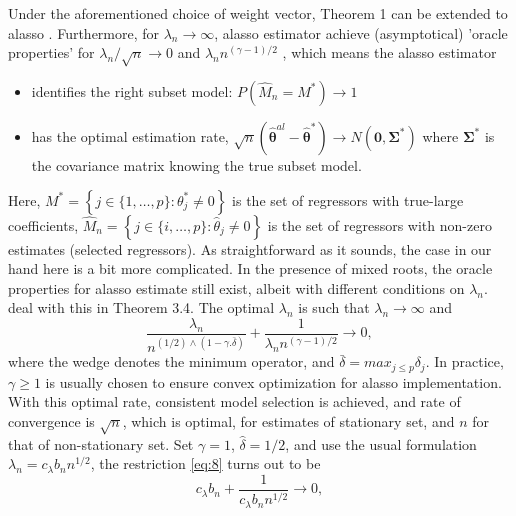 \documentclass[12pt,a4paper]{article}
\begin{document}
Under the aforementioned choice of weight vector, Theorem 1 can be extended to alasso \citep{knight2000asymptotics}. Furthermore, for $\lambda_n \rightarrow \infty $, alasso estimator achieve (asymptotical) 'oracle properties' for $ \lambda_n/\sqrt{n} \rightarrow 0 $ and $ \lambda_nn^{(\gamma - 1)/2} $ \citep{zou2006adaptive}, which means the alasso estimator
\begin{itemize}
	\item identifies the right subset model: $ P(\hat{M}_n = M^*) \rightarrow 1 $
	\item has the optimal estimation rate, $\sqrt{n}(\hat{\bm{\theta}}^{al} - \hat{\bm{\theta}}^*) \rightarrow N(\bm{0}, \bm{\Sigma}^*) $  where $ \bm{\Sigma}^* $ is the covariance matrix knowing the true subset model.
\end{itemize}
Here, $ M^* = \left\lbrace j \in \{1, \ldots, p\}: \theta^*_j \neq 0 \right\rbrace $ is the set of regressors with true-large coefficients, $ \hat{M}_n = \left\lbrace j \in \{i, \ldots, p\}:\hat{\theta}_j \neq 0 \right\rbrace $ is the set of regressors with non-zero estimates (selected regressors). As straightforward as it sounds, the case in our hand here is a bit more complicated. In the presence of mixed roots, the oracle properties for alasso estimate still exist, albeit with different conditions on $ \lambda_n $. \cite{lee2018lasso} deal with this in Theorem 3.4. The optimal $ \lambda_n $ is such that $ \lambda_n \rightarrow \infty $ and
\begin{equation}\label{eq:8}
	\frac{\lambda_n}{n^{(1 / 2) \wedge (1 - \gamma.\bar{\delta})}} + 
	\frac{1}{\lambda_nn^{(\gamma - 1)/2}} \rightarrow 0,
\end{equation} 
where the wedge denotes the minimum operator, and $ \bar{\delta} = max_{j \leq p}\delta_j $.  In practice, $ \gamma \geq 1 $ is usually chosen to ensure convex optimization for alasso implementation. With this optimal rate, consistent model selection is achieved, and rate of convergence is $ \sqrt{n} $, which is optimal, for estimates of stationary set, and $ n $ for that of non-stationary set. Set $ \gamma = 1 $, $ \hat{\delta} = 1/2 $, and use the usual formulation $ \lambda_n = c_\lambda b_n n^{1/2} $, the restriction \eqref{eq:8} turns out to be
	\begin{equation}\label{eq:9}
	c_\lambda b_n + \frac{1}{c_\lambda b_n n^{1/2}} \rightarrow 0,
	\end{equation}
\end{document}
